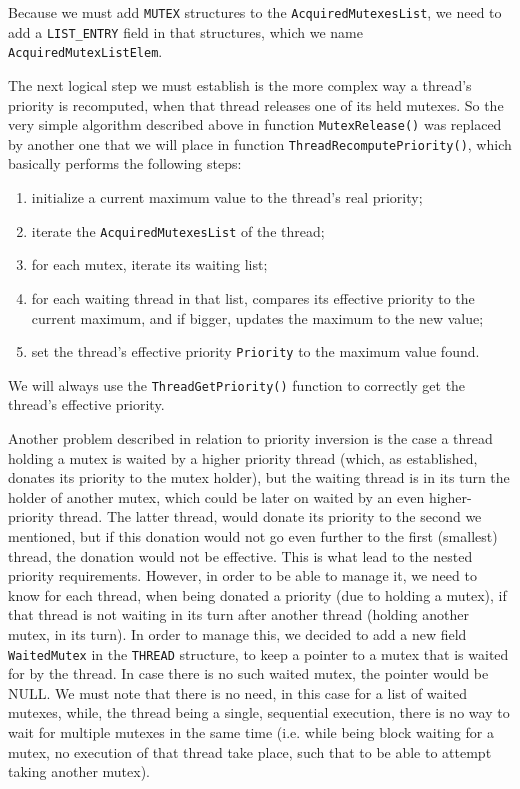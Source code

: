 Because we must add \lstinline|MUTEX| structures to the \lstinline|AcquiredMutexesList|, we need to add a \lstinline|LIST_ENTRY| field in that structures, which we name \lstinline|AcquiredMutexListElem|. 

The next logical step we must establish is the more complex way a thread's priority is recomputed, when that thread releases one of its held mutexes. So the very simple algorithm described above in function \lstinline|MutexRelease()| was replaced by another one that we will place in function \lstinline|ThreadRecomputePriority()|, which basically performs the following steps:
\begin{enumerate}
    \item initialize a current maximum value to the thread's real priority;
    \item iterate the \lstinline|AcquiredMutexesList| of the thread;
    \item for each mutex, iterate its waiting list;
    \item for each waiting thread in that list, compares its effective priority to the current maximum, and if bigger, updates the maximum to the new value;
    \item set the thread's effective priority \lstinline|Priority| to the maximum value found.
\end{enumerate}

We will always use the \lstinline|ThreadGetPriority()| function to correctly get the thread's effective priority. 

Another problem described in relation to priority inversion is the case a thread holding a mutex is waited by a higher priority thread (which, as established, donates its priority to the mutex holder), but the waiting thread is in its turn the holder of another mutex, which could be later on waited by an even higher-priority thread. The latter thread, would donate its priority to the second we mentioned, but if this donation would not go even further to the first (smallest) thread, the donation would not be effective. This is what lead to the nested priority requirements. However, in order to be able to manage it, we need to know for each thread, when being donated a priority (due to holding a mutex), if that thread is not waiting in its turn after another thread (holding another mutex, in its turn). In order to manage this, we decided to add a new field \lstinline|WaitedMutex| in the \lstinline|THREAD| structure, to keep a pointer to a mutex that is waited for by the thread. In case there is no such waited mutex, the pointer would be NULL. We must note that there is no need, in this case for a list of waited mutexes, while, the thread being a single, sequential execution, there is no way to wait for multiple mutexes in the same time (i.e. while being block waiting for a mutex, no execution of that thread take place, such that to be able to attempt taking another mutex). 

